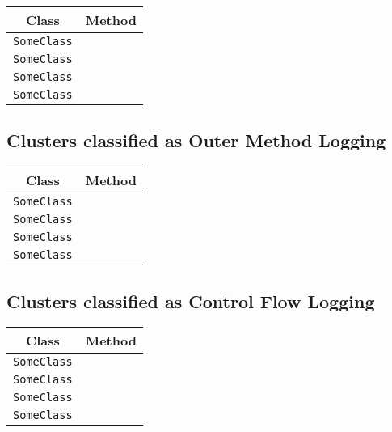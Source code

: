 \begin{center}
\begin{tabular}{ll}\toprule
\multicolumn{1}{c}{Class}&\multicolumn{1}{c}{Method}\\\midrule
\lstinline/SomeClass/&\raisebox{0pt}{\lstinline/foo(int)/}\\
\lstinline/SomeClass/&\raisebox{0pt}{\lstinline/foo(int)/}\\
\lstinline/SomeClass/&\raisebox{0pt}{\lstinline/foo(int)/}\\
\lstinline/SomeClass/&\raisebox{0pt}{\lstinline/foo(int)/}\\
\bottomrule
\end{tabular}
\end{center}

\subsection{Clusters classified as Outer Method Logging}

\begin{center}
\begin{tabular}{ll}\toprule
\multicolumn{1}{c}{Class}&\multicolumn{1}{c}{Method}\\\midrule
\lstinline/SomeClass/&\raisebox{0pt}{\lstinline/foo(int)/}\\
\lstinline/SomeClass/&\raisebox{0pt}{\lstinline/foo(int)/}\\
\lstinline/SomeClass/&\raisebox{0pt}{\lstinline/foo(int)/}\\
\lstinline/SomeClass/&\raisebox{0pt}{\lstinline/foo(int)/}\\
\bottomrule
\end{tabular}
\end{center}

\subsection{Clusters classified as Control Flow Logging}

\begin{center}
\begin{tabular}{ll}\toprule
\multicolumn{1}{c}{Class}&\multicolumn{1}{c}{Method}\\\midrule
\lstinline/SomeClass/&\raisebox{0pt}{\lstinline/foo(int)/}\\
\lstinline/SomeClass/&\raisebox{0pt}{\lstinline/foo(int)/}\\
\lstinline/SomeClass/&\raisebox{0pt}{\lstinline/foo(int)/}\\
\lstinline/SomeClass/&\raisebox{0pt}{\lstinline/foo(int)/}\\
\bottomrule
\end{tabular}
\end{center}

